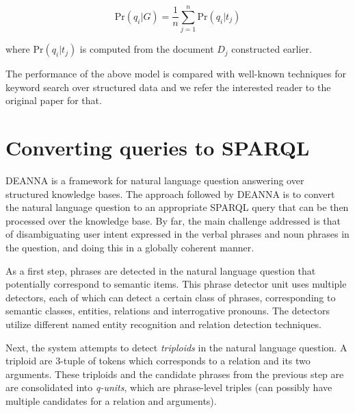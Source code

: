 \documentclass[a4paper, twoside, 12pt]{report}
\begin{document}
 $$ \text{Pr}(q_i|G) = \frac{1}{n} \sum_{j=1}^{n} \text{Pr}(q_i|t_j)$$

 where $\text{Pr}(q_i | t_j)$ is computed from the document $D_j$ constructed earlier.

 The performance of the above model is compared with well-known techniques for keyword search over structured data \cite{bhalotia2002keyword, nie2007web} and we refer the interested reader to the original paper \cite{elbassuoni2011keyword} for that.


\section{Converting queries to SPARQL}

DEANNA \cite{yahya2012deep} is a framework for natural language question answering over structured knowledge bases. The approach followed by DEANNA is to convert the natural language question to an appropriate SPARQL query that can be then processed over the knowledge base. By far, the main challenge addressed is that of disambiguating user intent expressed in the verbal phrases and noun phrases in the question, and doing this in a globally coherent manner.

As a first step, phrases are detected in the natural language question that potentially correspond to semantic items. This phrase detector unit uses multiple detectors, each of which can detect a certain class of phrases, corresponding to semantic classes, entities, relations and interrogative pronouns. The detectors utilize different named entity recognition and relation detection techniques.

Next, the system attempts to detect \emph{triploids} in the natural language question. A triploid are 3-tuple of tokens which corresponds to a relation and its two arguments. These triploids and the candidate phrases from the previous step are are consolidated into \emph{q-units}, which are phrase-level triples (can possibly have multiple candidates for a relation and arguments).
\end{document}

